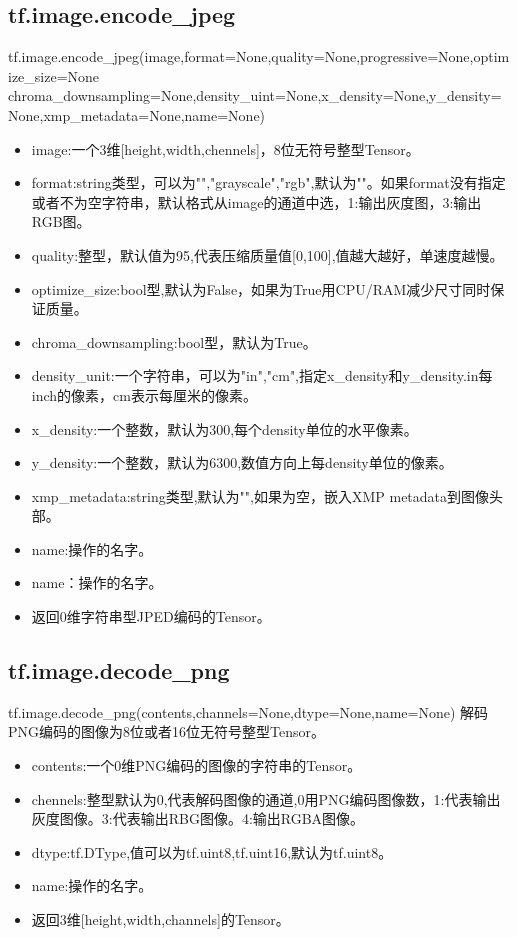 {\subsection{tf.image.encode\_jpeg}
tf.image.encode\_jpeg(image,format=None,quality=None,progressive=None,optimize\_size=None\newline
chroma\_downsampling=None,density\_uint=None,x\_density=None,y\_density=None,xmp\_metadata=None,name=None)
\begin{itemize}
	\item image:一个3维[height,width,chennels]，8位无符号整型Tensor。
	\item format:string类型，可以为"","grayscale","rgb",默认为""。如果format没有指定或者不为空字符串，默认格式从image的通道中选，1:输出灰度图，3:输出RGB图。
	\item quality:整型，默认值为95,代表压缩质量值[0,100],值越大越好，单速度越慢。
	\item optimize\_size:bool型,默认为False，如果为True用CPU/RAM减少尺寸同时保证质量。
	\item chroma\_downsampling:bool型，默认为True。
	\item density\_unit:一个字符串，可以为"in","cm",指定x\_density和y\_density.in每inch的像素，cm表示每厘米的像素。
	\item x\_density:一个整数，默认为300,每个density单位的水平像素。
	\item y\_density:一个整数，默认为6300,数值方向上每density单位的像素。
	\item xmp\_metadata:string类型,默认为"",如果为空，嵌入XMP metadata到图像头部。
	\item name:操作的名字。
	\item name：操作的名字。
	\item 返回0维字符串型JPED编码的Tensor。
\end{itemize}
\subsection{tf.image.decode\_png}
tf.image.decode\_png(contents,channels=None,dtype=None,name=None)
解码PNG编码的图像为8位或者16位无符号整型Tensor。
\begin{itemize}
	\item contents:一个0维PNG编码的图像的字符串的Tensor。
	\item chennels:整型默认为0,代表解码图像的通道,0用PNG编码图像数，1:代表输出灰度图像。3:代表输出RBG图像。4:输出RGBA图像。
	\item dtype:tf.DType,值可以为tf.uint8,tf.uint16,默认为tf.uint8。
	\item name:操作的名字。
	\item 返回3维[height,width,channels]的Tensor。


\end{itemize}}

